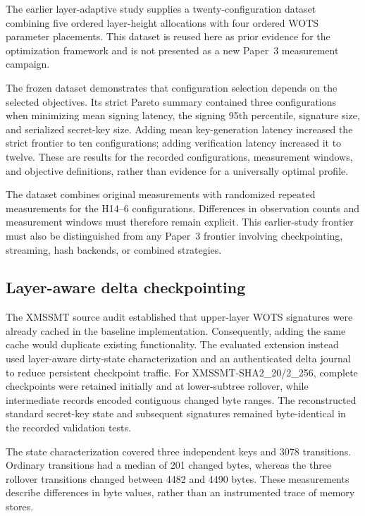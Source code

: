 \documentclass[pdflatex,sn-mathphys-num]{sn-jnl}
\begin{document}
The earlier layer-adaptive study supplies a twenty-configuration
dataset combining five ordered layer-height allocations with four
ordered WOTS parameter placements. This dataset is reused here as
prior evidence for the optimization framework and is not presented
as a new Paper~3 measurement campaign.

The frozen dataset demonstrates that configuration selection depends
on the selected objectives. Its strict Pareto summary contained three
configurations when minimizing mean signing latency, the signing
95th percentile, signature size, and serialized secret-key size.
Adding mean key-generation latency increased the strict frontier
to ten configurations; adding verification latency increased it
to twelve. These are results for the recorded configurations,
measurement windows, and objective definitions, rather than evidence
for a universally optimal profile.

The dataset combines original measurements with randomized repeated
measurements for the H14--6 configurations. Differences in observation
counts and measurement windows must therefore remain explicit.
This earlier-study frontier must also be distinguished from any
Paper~3 frontier involving checkpointing, streaming, hash backends,
or combined strategies.

\subsection{Layer-aware delta checkpointing}
\label{subsec:delta_checkpoint_review}

The XMSSMT source audit established that upper-layer WOTS signatures
were already cached in the baseline implementation. Consequently, adding
the same cache would duplicate existing functionality. The evaluated
extension instead used layer-aware dirty-state characterization and an
authenticated delta journal to reduce persistent checkpoint traffic.
For XMSSMT-SHA2\_20/2\_256, complete checkpoints were retained initially
and at lower-subtree rollover, while intermediate records encoded
contiguous changed byte ranges. The reconstructed standard secret-key
state and subsequent signatures remained byte-identical in the recorded
validation tests.

The state characterization covered three independent keys and 3078
transitions. Ordinary transitions had a median of 201 changed bytes,
whereas the three rollover transitions changed between 4482 and
4490 bytes. These measurements describe differences in byte values,
rather than an instrumented trace of memory stores.
\end{document}
